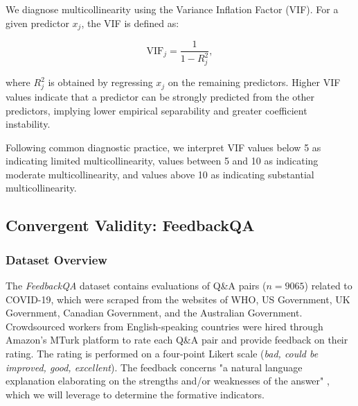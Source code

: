 We diagnose multicollinearity using the Variance Inflation Factor (VIF). For a given predictor $x_j$, the VIF is defined as:

\[
\mathrm{VIF}_j = \frac{1}{1 - R_j^2},
\]

where $R_j^2$ is obtained by regressing $x_j$ on the remaining predictors. Higher VIF values indicate that a predictor can be strongly predicted from the other predictors, implying lower empirical separability and greater coefficient instability.

Following common diagnostic practice, we interpret VIF values below 5 as indicating limited multicollinearity, values between 5 and 10 as indicating moderate multicollinearity, and values above 10 as indicating substantial multicollinearity. 


\subsection{Convergent Validity: FeedbackQA}\label{sec:methods_feedbackqa}

\subsubsection{Dataset Overview}

The \textit{FeedbackQA} dataset \citet{li_using_2022} contains evaluations of Q\&A pairs ($n=9065$) related to COVID-19, which were scraped from the websites of WHO, US Government, UK Government, Canadian Government, and the Australian Government. Crowdsourced workers from English-speaking countries were hired through Amazon's MTurk platform to rate each Q\&A pair and provide feedback on their rating. The rating is performed on a four-point Likert scale (\textit{bad, could be improved, good, excellent}). The feedback concerns "a natural language explanation elaborating on the strengths and/or weaknesses of the answer" \citep{li_using_2022}, which we will leverage to determine the formative indicators.


